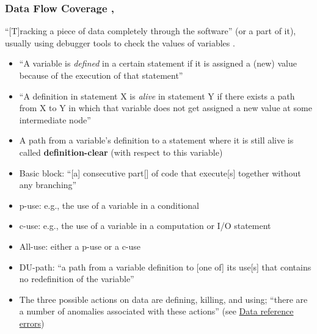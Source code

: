 \subsubsection[Data Flow Coverage]{Data Flow Coverage \citep[p.~114]{Patton2006},
      \citep[pp.~424-425]{vanVliet2000}}
\label{data-flow-coverage}

``[T]racking a piece of data completely through the software'' (or a part of
it), usually using debugger tools to check the values of variables
\citep[p.~114]{Patton2006}.

\begin{itemize}
      \item ``A variable is \emph{defined} in a certain statement if it is
            assigned a (new) value because of the execution of that
            statement'' \citep[p.~424]{vanVliet2000}
      \item ``A definition in statement X is \emph{alive} in statement Y if
            there exists a path from X to Y in which that variable does not
            get assigned a new value at some intermediate node''
            \citep[p.~424]{vanVliet2000}
      \item A path from a variable's definition to a statement where it is
            still alive is called \textbf{definition-clear} (with respect to
            this variable) \citep[p.~424]{vanVliet2000}
      \item Basic block: ``[a] consecutive part[] of code that execute[s]
            together without any branching'' \citep[p.~477]{PetersAndPedrycz2000}
      \item \acf{p-use}: e.g., the use of a variable in a conditional
            \citep[p.~424]{vanVliet2000}
      \item \acf{c-use}: e.g., the use of a variable in a computation or I/O
            statement \citep[p.~424]{vanVliet2000}
      \item All-use: either a \acs{p-use} or a \acs{c-use}~
            \citep[p.~478]{PetersAndPedrycz2000}
      \item DU-path: ``a path from a variable definition to [one of] its use[s]
            that contains no redefinition of the variable''
            \citep[pp.~478-479]{PetersAndPedrycz2000}
      \item The three possible actions on data are defining, killing, and using;
            ``there are a number of anomalies associated with these actions''
            \citep[pp.~478,~480]{PetersAndPedrycz2000}
            (see \hyperref[data-ref-errors]{Data reference errors})
\end{itemize}


